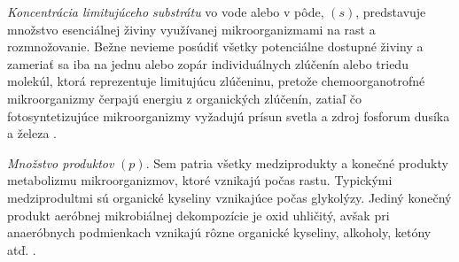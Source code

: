 \textit{Koncentrácia limitujúceho substrátu} vo vode alebo v pôde, $(s)$, predstavuje množstvo esenciálnej živiny využívanej mikroorganizmami na rast a rozmnožovanie. Bežne nevieme posúdiť všetky potenciálne dostupné živiny a zameriať sa iba na jednu alebo zopár individuálnych zlúčenín alebo triedu
molekúl, ktorá reprezentuje limitujúcu zlúčeninu, pretože chemoorganotrofné mikroorganizmy čerpajú energiu z organických zlúčenín, zatiaľ čo fotosyntetizujúce mikroorganizmy vyžadujú prísun svetla a zdroj fosforum dusíka a železa \cite{ref2}.

\textit{Množstvo produktov} $(p)$. Sem patria všetky medziprodukty a konečné produkty metabolizmu mikroorganizmov, ktoré vznikajú počas rastu. Typickými medziprodultmi sú organické kyseliny vznikajúce počas glykolýzy. Jediný konečný produkt aeróbnej mikrobiálnej dekompozície je oxid uhličitý, avšak pri anaeróbnych podmienkach vznikajú rôzne organické kyseliny, alkoholy, ketóny atď. \cite{ref2}.
